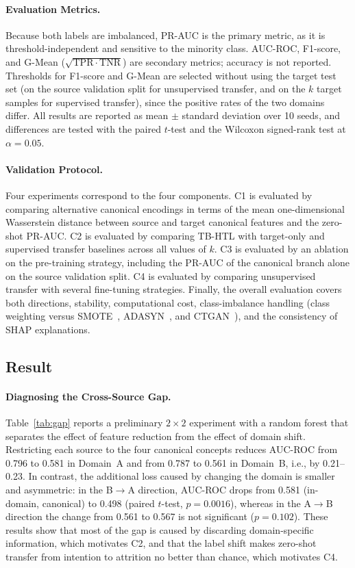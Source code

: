 \documentclass[runningheads]{llncs}
\begin{document}
\paragraph{Evaluation Metrics.} Because both labels are imbalanced, PR-AUC is the primary metric, as it is threshold-independent and sensitive to the minority class. AUC-ROC, F1-score, and G-Mean ($\sqrt{\mathrm{TPR}\cdot\mathrm{TNR}}$) are secondary metrics; accuracy is not reported. Thresholds for F1-score and G-Mean are selected without using the target test set (on the source validation split for unsupervised transfer, and on the $k$ target samples for supervised transfer), since the positive rates of the two domains differ. All results are reported as mean $\pm$ standard deviation over 10 seeds, and differences are tested with the paired $t$-test and the Wilcoxon signed-rank test at $\alpha=0.05$.

\paragraph{Validation Protocol.} Four experiments correspond to the four components. C1 is evaluated by comparing alternative canonical encodings in terms of the mean one-dimensional Wasserstein distance between source and target canonical features and the zero-shot PR-AUC. C2 is evaluated by comparing TB-HTL with target-only and supervised transfer baselines across all values of $k$. C3 is evaluated by an ablation on the pre-training strategy, including the PR-AUC of the canonical branch alone on the source validation split. C4 is evaluated by comparing unsupervised transfer with several fine-tuning strategies. Finally, the overall evaluation covers both directions, stability, computational cost, class-imbalance handling (class weighting versus SMOTE~\cite{chawla2002}, ADASYN~\cite{he2008}, and CTGAN~\cite{xu2019}), and the consistency of SHAP explanations.

\subsection{Result}
\paragraph{Diagnosing the Cross-Source Gap.}\label{sec:gap}
Table~\ref{tab:gap} reports a preliminary $2\times2$ experiment with a random forest that separates the effect of feature reduction from the effect of domain shift. Restricting each source to the four canonical concepts reduces AUC-ROC from 0.796 to 0.581 in Domain~A and from 0.787 to 0.561 in Domain~B, i.e., by 0.21--0.23. In contrast, the additional loss caused by changing the domain is smaller and asymmetric: in the B$\to$A direction, AUC-ROC drops from 0.581 (in-domain, canonical) to 0.498 (paired $t$-test, $p=0.0016$), whereas in the A$\to$B direction the change from 0.561 to 0.567 is not significant ($p=0.102$). These results show that most of the gap is caused by discarding domain-specific information, which motivates C2, and that the label shift makes zero-shot transfer from intention to attrition no better than chance, which motivates C4.
\end{document}
